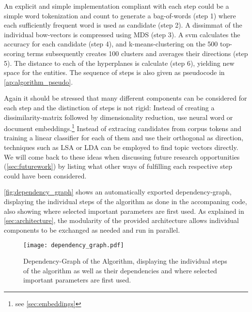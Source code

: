  An explicit and simple implementation compliant with each step could be a simple word tokenization and count to generate a bag-of-words (step 1) where each sufficiently frequent word is used as candidate (step 2). A \gls{dissimmat} of the individual \gls{bow}-vectors is compressed using MDS (step 3). A \gls{svm} calculates the accuracy for each candidate (step 4), and k-means-clustering on the 500 top-scoring terms subsequently creates 100 clusters and averages their directions (step 5). The distance to each of the hyperplanes is calculate (step 6), yielding new space for the entities. The sequence of steps is also given as pseudocode in \autoref{ap:algorithm_pseudo}. 
 
 Again it should be stressed that many different components can be considered for each step and the distinction of steps is not rigid: Instead of creating a dissimilarity-matrix followed by dimensionality reduction, \cite{Ager2018,Alshaikh2020} use neural word or document embeddings.\footnote{see \autoref{sec:embeddings}} Instead of extracing candidates from corpus tokens and training a linear classifier for each of them and use their orthogonal as direction, techniques such as LSA or LDA can be employed to find topic vectors directly. We will come back to these ideas when discussing future research opportunities (\autoref{sec:futurework}) by listing what other ways of fulfilling each respective step could have been considered.

\autoref{fig:dependency_graph} shows an automatically exported dependency-graph, displaying the individual steps of the algorithm as done in the accompaning code, also showing where selected important parameters are first used. As explained in \autoref{sec:architecture}, the modularity of the provided architecture allows individual components to be exchanged as needed and run in parallel.


\begin{figure}[H]
	\begin{center}
	  \texttt{[image: dependency\_graph.pdf]}
	  \caption[Dependency-Graph of the Algorithm]{Dependency-Graph of the Algorithm, displaying the individual steps of the algorithm as well as their dependencies and where selected important parameters are first used. }
	  \label{fig:dependency_graph}
	\end{center}
\end{figure}


